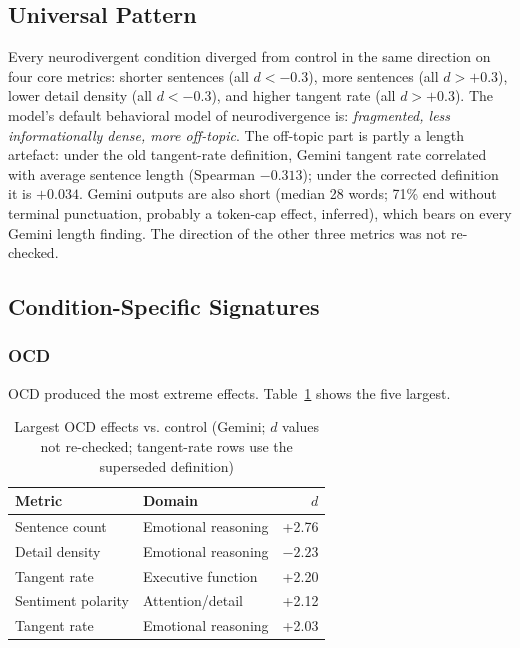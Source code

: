 \documentclass[conference]{IEEEtran}
\begin{document}
\subsection{Universal Pattern}

Every neurodivergent condition diverged from control in the same direction on four core metrics: shorter sentences (all $d < -0.3$), more sentences (all $d > +0.3$), lower detail density (all $d < -0.3$), and higher tangent rate (all $d > +0.3$). The model's default behavioral model of neurodivergence is: \textit{fragmented, less informationally dense, more off-topic}. The off-topic part is partly a length artefact: under the old tangent-rate definition, Gemini tangent rate correlated with average sentence length (Spearman $-0.313$); under the corrected definition it is $+0.034$. Gemini outputs are also short (median 28 words; 71\% end without terminal punctuation, probably a token-cap effect, inferred), which bears on every Gemini length finding. The direction of the other three metrics was not re-checked.

\subsection{Condition-Specific Signatures}

\subsubsection{OCD}

OCD produced the most extreme effects. Table~\ref{tab:ocd} shows the five largest.

\begin{table}[htbp]
\centering
\caption{Largest OCD effects vs. control (Gemini; $d$ values not re-checked; tangent-rate rows use the superseded definition)}
\label{tab:ocd}
\begin{tabular}{llr}
\toprule
\textbf{Metric} & \textbf{Domain} & \textbf{$d$} \\
\midrule
Sentence count & Emotional reasoning & +2.76 \\
Detail density & Emotional reasoning & $-2.23$ \\
Tangent rate & Executive function & +2.20 \\
Sentiment polarity & Attention/detail & +2.12 \\
Tangent rate & Emotional reasoning & +2.03 \\
\bottomrule
\end{tabular}
\end{table}
\end{document}
